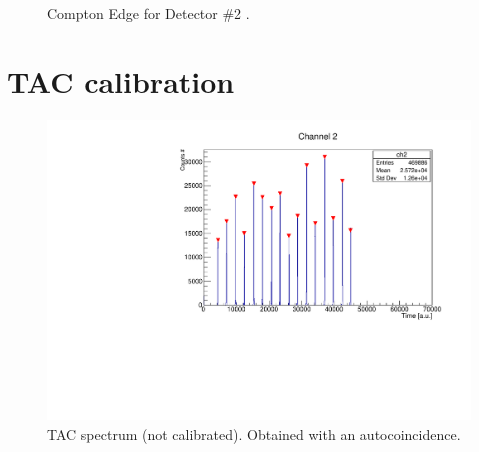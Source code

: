 \documentclass[a4paper,11pt]{article}
\begin{document}
\begin{figure}[h!]
\centering
{} \quad
{} \\
\caption{Compton Edge for Detector \#2 .}
\end{figure}

\clearpage
\section*{TAC calibration}

\begin{figure}[h!]
\centering
\includegraphics[scale=0.5]{tac_uncalibrated_spectrum.pdf}
\caption{TAC spectrum (not calibrated). Obtained with an autocoincidence.}
\end{figure}
\end{document}
